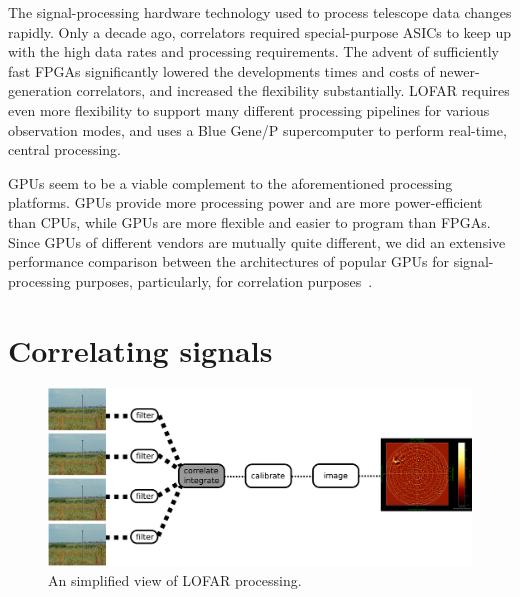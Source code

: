 \documentclass{article}
\begin{document}
The signal-processing hardware technology used to process telescope data
changes rapidly.
Only a decade ago, correlators required special-purpose ASICs to keep up with
the high data rates and processing requirements.
The advent of sufficiently fast FPGAs significantly lowered the developments
times and costs of newer-generation correlators, and increased the flexibility
substantially.
LOFAR requires even more flexibility to support many different processing
pipelines for various observation modes, and uses a Blue Gene/P supercomputer
to perform real-time, central processing.

GPUs seem to be a viable complement to the aforementioned processing platforms.
GPUs provide more processing power and are more power-efficient than CPUs,
while GPUs are more flexible and easier to program than FPGAs.
Since GPUs of different vendors are mutually quite different, we did an
extensive performance comparison between the architectures of popular GPUs 
for signal-processing purposes, particularly, for correlation
purposes~\cite{Nieuwpoort:09}.


\section{Correlating signals}

\begin{figure}[t]
\begin{center}
\includegraphics[width=12cm]{figures/processing-overview.pdf}
\end{center}
\vspace{-0.5cm}
\caption{An simplified view of LOFAR processing.}
\label{fig-processing-overview}
\end{figure}
\end{document}
